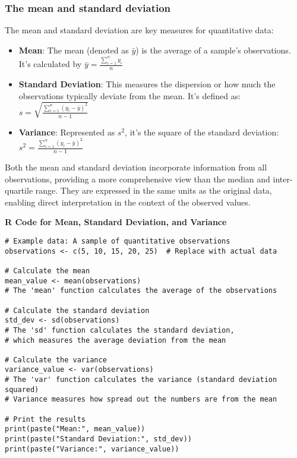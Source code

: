 \documentclass{article}
\begin{document}
\subsubsection{The mean and standard deviation}
The mean and standard deviation are key measures for quantitative data:

\begin{itemize}
    \item \textbf{Mean}: The mean (denoted as $\bar{y}$) is the average of a sample's observations. It's calculated by $\bar{y}=\frac{\sum_{i=1}^{n} {y_i}}{n}$ 
    \item \textbf{Standard Deviation}:  This measures the dispersion or how much the observations typically deviate from the mean.
    It's defined as: $s=\sqrt{\frac{\sum_{i=1}^{n} ({y_i-\bar{y}})^2}{n-1}}$
    \item \textbf{Variance}: Represented as $s^2$, it's the square of the standard deviation: $s^2=\frac{\sum_{i=1}^{n} ({y_i-\bar{y}})^2}{n-1}$
\end{itemize}

Both the mean and standard deviation incorporate information from all observations, providing a more comprehensive view than the median and inter-quartile range. They are expressed in the same units as the original data, enabling direct interpretation in the context of the observed values.

\pagebreak

\textbf{R Code for Mean, Standard Deviation, and Variance}

\begin{lstlisting}
# Example data: A sample of quantitative observations
observations <- c(5, 10, 15, 20, 25)  # Replace with actual data

# Calculate the mean
mean_value <- mean(observations)
# The 'mean' function calculates the average of the observations

# Calculate the standard deviation
std_dev <- sd(observations)
# The 'sd' function calculates the standard deviation, 
# which measures the average deviation from the mean

# Calculate the variance
variance_value <- var(observations)
# The 'var' function calculates the variance (standard deviation squared)
# Variance measures how spread out the numbers are from the mean

# Print the results
print(paste("Mean:", mean_value))
print(paste("Standard Deviation:", std_dev))
print(paste("Variance:", variance_value))

\end{lstlisting}
\end{document}
